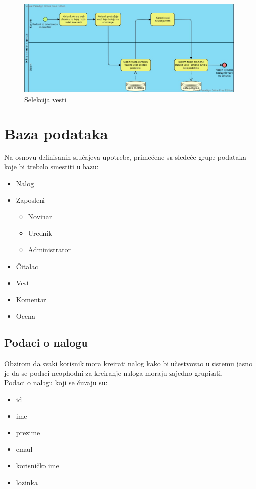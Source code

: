 \documentclass{article}
\begin{document}
\begin{figure}[htbp!]
    \centering
    \includegraphics[scale=0.35]{Selekcija_vesti.jpg}
    \caption{Selekcija vesti}
    \label{slk:dtp}
\end{figure} 

\newpage

\section{Baza podataka}
Na osnovu definisanih slučajeva upotrebe, primećene su sledeće grupe podataka koje bi trebalo smestiti u bazu:
\begin{itemize}
    \item Nalog
    \item Zaposleni
        \begin{itemize}
            \item Novinar
            \item Urednik
            \item Administrator 
        \end{itemize}
    \item Čitalac
    \item Vest
    \item Komentar
    \item Ocena
\end{itemize}

\subsection{Podaci o nalogu}
Obzirom da svaki korisnik mora kreirati nalog kako bi učestvovao u sistemu jasno je da se podaci neophodni za kreiranje naloga moraju zajedno grupisati. \\

Podaci o nalogu koji se čuvaju su:
\begin{itemize}
    \item id
    \item ime
    \item prezime
    \item email
    \item korisničko ime
    \item lozinka
\end{itemize}
\end{document}
